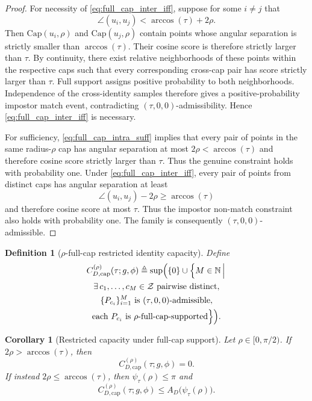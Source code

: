 \documentclass[journal]{IEEEtran}
\newtheorem{definition}[theorem]{Definition}
\newtheorem{corollary}[theorem]{Corollary}
\begin{document}
\begin{bibunit}
\begin{proof}
For necessity of \eqref{eq:full_cap_inter_iff}, suppose for some $i\ne j$ that
%
\begin{equation}
\angle(u_i,u_j) < \arccos(\tau)+2\rho.
\end{equation}
%
Then $\mathrm{Cap}(u_i,\rho)$ and $\mathrm{Cap}(u_j,\rho)$ contain points whose angular separation is strictly smaller than $\arccos(\tau)$. Their cosine score is therefore strictly larger than $\tau$. By continuity, there exist relative neighborhoods of these points within the respective caps such that every corresponding cross-cap pair has score strictly larger than $\tau$. Full support assigns positive probability to both neighborhoods. Independence of the cross-identity samples therefore gives a positive-probability impostor match event, contradicting $(\tau,0,0)$-admissibility. Hence \eqref{eq:full_cap_inter_iff} is necessary.

For sufficiency, \eqref{eq:full_cap_intra_suff} implies that every pair of points in the same radius-$\rho$ cap has angular separation at most $2\rho<\arccos(\tau)$ and therefore cosine score strictly larger than $\tau$. Thus the genuine constraint holds with probability one. Under \eqref{eq:full_cap_inter_iff}, every pair of points from distinct caps has angular separation at least
\[
\angle(u_i,u_j)-2\rho \ge \arccos(\tau)
\]
and therefore cosine score at most $\tau$. Thus the impostor non-match constraint also holds with probability one. The family is consequently $(\tau,0,0)$-admissible.
%
\end{proof}

\begin{definition}[$\rho$-full-cap restricted identity capacity]
\label{def:full_cap_restricted_capacity}
%
Define
%
\begin{multline}
C_{D,\mathrm{cap}}^{(\rho)}(\tau;g,\phi) \triangleq \sup\Bigl( \{0\}\cup
\Bigl\{ M\in\mathbb N  \,\Big|\, \\
\exists\,c_1,\ldots,c_M\in\mathcal Z
\text{ pairwise distinct},\\
\{P_{c_i}\}_{i=1}^M
\text{ is }(\tau,0,0)\text{-admissible}, \\
\text{each }P_{c_i}\text{ is }\rho\text{-full-cap-supported} \Bigr\} \Bigr).
\label{eq:full_cap_capacity_def}
\end{multline}
%
\end{definition}

\begin{corollary}[Restricted capacity under full-cap support]
\label{cor:full_cap_packing_upper}
%
Let $\rho\in[0,\pi/2)$. If $2\rho>\arccos(\tau)$, then
%
\begin{equation}
C_{D,\mathrm{cap}}^{(\rho)}(\tau;g,\phi) = 0.
\label{eq:full_cap_zero_capacity}
\end{equation}
%
If instead $2\rho\le\arccos(\tau)$, then $\psi_\tau(\rho)\le\pi$ and
%
\begin{equation}
C_{D,\mathrm{cap}}^{(\rho)}(\tau;g,\phi) \le A_D\bigl(\psi_\tau(\rho)\bigr).
\label{eq:full_cap_packing_upper}
\end{equation}
%
\end{corollary}


\end{bibunit}
\end{document}
